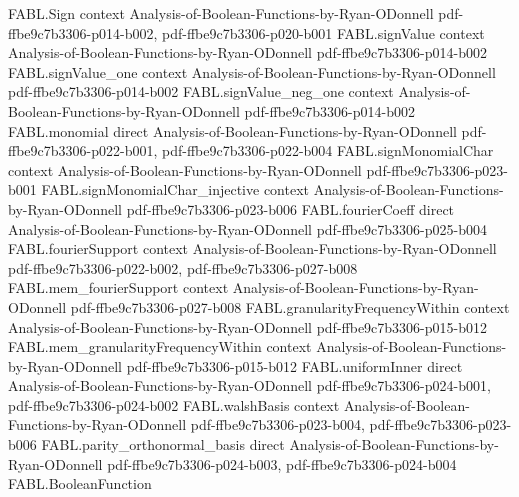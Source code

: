 \begin{theorem}
\label{FABL.majority_toReal_isSymmetric}
\leanok
{}
\proofstep
  {FABL.Sign}
  {context}
  {Analysis-of-Boolean-Functions-by-Ryan-ODonnell}
  {pdf-ffbe9c7b3306-p014-b002,
    pdf-ffbe9c7b3306-p020-b001}
\proofstep
  {FABL.signValue}
  {context}
  {Analysis-of-Boolean-Functions-by-Ryan-ODonnell}
  {pdf-ffbe9c7b3306-p014-b002}
\proofstep
  {FABL.signValue_one}
  {context}
  {Analysis-of-Boolean-Functions-by-Ryan-ODonnell}
  {pdf-ffbe9c7b3306-p014-b002}
\proofstep
  {FABL.signValue_neg_one}
  {context}
  {Analysis-of-Boolean-Functions-by-Ryan-ODonnell}
  {pdf-ffbe9c7b3306-p014-b002}
\proofstep
  {FABL.monomial}
  {direct}
  {Analysis-of-Boolean-Functions-by-Ryan-ODonnell}
  {pdf-ffbe9c7b3306-p022-b001,
    pdf-ffbe9c7b3306-p022-b004}
\proofstep
  {FABL.signMonomialChar}
  {context}
  {Analysis-of-Boolean-Functions-by-Ryan-ODonnell}
  {pdf-ffbe9c7b3306-p023-b001}
\proofstep
  {FABL.signMonomialChar_injective}
  {context}
  {Analysis-of-Boolean-Functions-by-Ryan-ODonnell}
  {pdf-ffbe9c7b3306-p023-b006}
\proofstep
  {FABL.fourierCoeff}
  {direct}
  {Analysis-of-Boolean-Functions-by-Ryan-ODonnell}
  {pdf-ffbe9c7b3306-p025-b004}
\proofstep
  {FABL.fourierSupport}
  {context}
  {Analysis-of-Boolean-Functions-by-Ryan-ODonnell}
  {pdf-ffbe9c7b3306-p022-b002,
    pdf-ffbe9c7b3306-p027-b008}
\proofstep
  {FABL.mem_fourierSupport}
  {context}
  {Analysis-of-Boolean-Functions-by-Ryan-ODonnell}
  {pdf-ffbe9c7b3306-p027-b008}
\proofstep
  {FABL.granularityFrequencyWithin}
  {context}
  {Analysis-of-Boolean-Functions-by-Ryan-ODonnell}
  {pdf-ffbe9c7b3306-p015-b012}
\proofstep
  {FABL.mem_granularityFrequencyWithin}
  {context}
  {Analysis-of-Boolean-Functions-by-Ryan-ODonnell}
  {pdf-ffbe9c7b3306-p015-b012}
\proofstep
  {FABL.uniformInner}
  {direct}
  {Analysis-of-Boolean-Functions-by-Ryan-ODonnell}
  {pdf-ffbe9c7b3306-p024-b001,
    pdf-ffbe9c7b3306-p024-b002}
\proofstep
  {FABL.walshBasis}
  {context}
  {Analysis-of-Boolean-Functions-by-Ryan-ODonnell}
  {pdf-ffbe9c7b3306-p023-b004,
    pdf-ffbe9c7b3306-p023-b006}
\proofstep
  {FABL.parity_orthonormal_basis}
  {direct}
  {Analysis-of-Boolean-Functions-by-Ryan-ODonnell}
  {pdf-ffbe9c7b3306-p024-b003,
    pdf-ffbe9c7b3306-p024-b004}
\proofstep
  {FABL.BooleanFunction}

\end{theorem}
